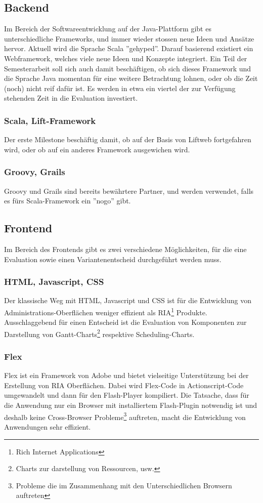 \subsection{Backend}
Im Bereich der Softwareentwicklung auf der Java-Plattform gibt es unterschiedliche Frameworks, und immer wieder stossen neue Ideen und Ans\"atze hervor. Aktuell wird die Sprache Scala ''gehyped''. Darauf basierend existiert ein Webframework, welches viele neue Ideen und Konzepte integriert. Ein Teil der Semesterarbeit soll sich auch damit besch\"aftigen, ob sich dieses Framework und die Sprache Java momentan f\"ur eine weitere Betrachtung lohnen, oder ob die Zeit (noch) nicht reif daf\"ur ist. Es werden in etwa ein viertel der zur Verf\"ugung stehenden Zeit in die Evaluation investiert.
\subsubsection{Scala, Lift-Framework}
Der erste Milestone besch\"aftig damit, ob auf der Basis von Liftweb fortgefahren wird, oder ob auf ein anderes Framework ausgewichen wird.

\subsubsection{Groovy, Grails}
Groovy und Grails sind bereits bew\"ahrtere Partner, und werden verwendet, falls es f\"urs Scala-Framework ein ''nogo'' gibt.

\subsection{Frontend}
Im Bereich des Frontends gibt es zwei verschiedene M\"oglichkeiten, f\"ur die eine Evaluation sowie einen Variantenentscheid durchgef\"uhrt werden muss.
\subsubsection{HTML, Javascript, CSS}
Der klassische Weg mit HTML, Javascript und CSS ist f\"ur die Entwicklung von Administrations-Oberfl\"achen weniger effizient als RIA\footnote{Rich Internet Applications} Produkte. Ausschlaggebend f\"ur einen Entscheid ist die Evaluation von Komponenten zur Darstellung von Gantt-Charts\footnote{Charts zur darstellung von Ressourcen, usw.} respektive Scheduling-Charts.

\subsubsection{Flex}
Flex ist ein Framework von Adobe und bietet vielseitige Unterst\"utzung bei der Erstellung von RIA Oberfl\"achen. Dabei wird Flex-Code in Actionscript-Code umgewandelt und dann f\"ur den Flash-Player kompiliert. Die Tatsache, dass f\"ur die Anwendung nur ein Browser mit installiertem Flash-Plugin notwendig ist und deshalb keine Cross-Browser Probleme\footnote{Probleme die im Zusammenhang mit den Unterschiedlichen Browsern auftreten} auftreten, macht die Entwicklung von Anwendungen sehr effizient.

